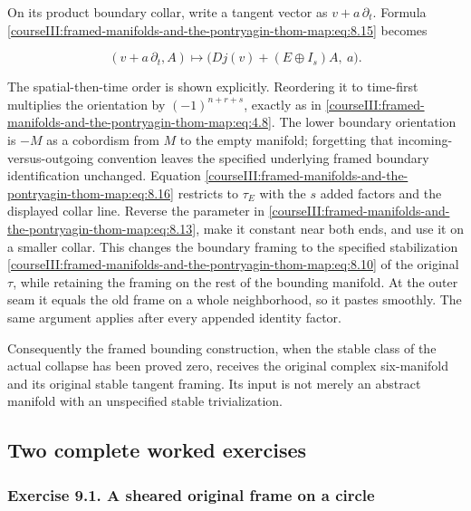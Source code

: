 On its product boundary collar, write a tangent vector as \(v+a\,\partial_t\). Formula \eqref{courseIII:framed-manifolds-and-the-pontryagin-thom-map:eq:8.15} becomes

\begin{equation}
(v+a\,\partial_t,A)\longmapsto
                         \bigl(Dj(v)+(E\oplus I_s)A,\ a\bigr).
 \label{courseIII:framed-manifolds-and-the-pontryagin-thom-map:eq:8.16}
\end{equation}

The spatial-then-time order is shown explicitly. Reordering it to time-first multiplies the orientation by \((-1)^{n+r+s}\), exactly as in \eqref{courseIII:framed-manifolds-and-the-pontryagin-thom-map:eq:4.8}. The lower boundary orientation is \(-M\) as a cobordism from \(M\) to the empty manifold; forgetting that incoming-versus-outgoing convention leaves the specified underlying framed boundary identification unchanged. Equation \eqref{courseIII:framed-manifolds-and-the-pontryagin-thom-map:eq:8.16} restricts to \(\tau_E\) with the \(s\) added factors and the displayed collar line. Reverse the parameter in \eqref{courseIII:framed-manifolds-and-the-pontryagin-thom-map:eq:8.13}, make it constant near both ends, and use it on a smaller collar. This changes the boundary framing to the specified stabilization \eqref{courseIII:framed-manifolds-and-the-pontryagin-thom-map:eq:8.10} of the original \(\tau\), while retaining the framing on the rest of the bounding manifold. At the outer seam it equals the old frame on a whole neighborhood, so it pastes smoothly. The same argument applies after every appended identity factor.

Consequently the framed bounding construction, when the stable class of the actual collapse has been proved zero, receives the original complex six-manifold and its original stable tangent framing. Its input is not merely an abstract manifold with an unspecified stable trivialization.

\label{courseIII:framed-manifolds-and-the-pontryagin-thom-map:pt-worked-exercises}

\subsection{Two complete worked exercises}
\label{courseIII:framed-manifolds-and-the-pontryagin-thom-map:section-9}

\subsubsection{Exercise 9.1. A sheared original frame on a circle}
\label{courseIII:framed-manifolds-and-the-pontryagin-thom-map:exercise-9.1}

